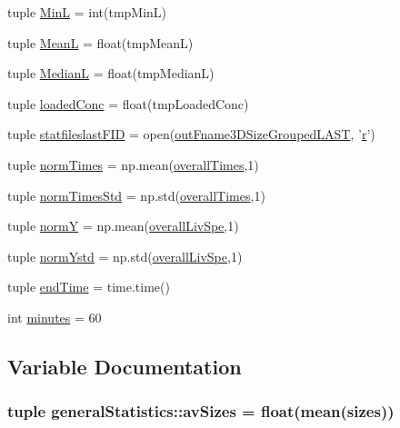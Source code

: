 \begin{DoxyCompactItemize}
tuple \hyperlink{namespacegeneral_statistics_a9d940b683251a6dc9ff0313a5f931da1}{\-Min\-L} = int(tmp\-Min\-L)
\item 
tuple \hyperlink{namespacegeneral_statistics_ab88669192815a1e37e03baefc3417e75}{\-Mean\-L} = float(tmp\-Mean\-L)
\item 
tuple \hyperlink{namespacegeneral_statistics_a3c165f47efb809460b0169ceb049ed52}{\-Median\-L} = float(tmp\-Median\-L)
\item 
tuple \hyperlink{namespacegeneral_statistics_a6b5cf2698396af31b36f7dbd4743164a}{loaded\-Conc} = float(tmp\-Loaded\-Conc)
\item 
tuple \hyperlink{namespacegeneral_statistics_a3ce9d5db09e5f3011e0b7b2375b4e702}{statfileslast\-F\-I\-D} = open(\hyperlink{namespacegeneral_statistics_a41b8a01562c7b02335cd9693c3e23742}{out\-Fname3\-D\-Size\-Grouped\-L\-A\-S\-T}, '\hyperlink{_k_s_search_launcher_8m_ac862e7284527eb913b1351c8bfb8e079}{r}')
\item 
tuple \hyperlink{namespacegeneral_statistics_aa828d0bb88c0d1db3d8477b2452d8e25}{norm\-Times} = np.\-mean(\hyperlink{namespacegeneral_statistics_a7a09c1a430c7f4d0a7a65e70d54651a0}{overall\-Times},1)
\item 
tuple \hyperlink{namespacegeneral_statistics_aed3e07509d7b31285bf3975023e243e1}{norm\-Times\-Std} = np.\-std(\hyperlink{namespacegeneral_statistics_a7a09c1a430c7f4d0a7a65e70d54651a0}{overall\-Times},1)
\item 
tuple \hyperlink{namespacegeneral_statistics_a9693505ac595a3847a5d258750c5b115}{norm\-Y} = np.\-mean(\hyperlink{namespacegeneral_statistics_a4df112574861c37c17c7a7c842bdd4e0}{overall\-Liv\-Spe},1)
\item 
tuple \hyperlink{namespacegeneral_statistics_ab775e3e84f49c48bb285c0713d55a6cd}{norm\-Ystd} = np.\-std(\hyperlink{namespacegeneral_statistics_a4df112574861c37c17c7a7c842bdd4e0}{overall\-Liv\-Spe},1)
\item 
tuple \hyperlink{namespacegeneral_statistics_aeb767013d3dae060634c685e388ffd5c}{end\-Time} = time.\-time()
\item 
int \hyperlink{namespacegeneral_statistics_ac4f1304faada68628850abb2e6101b10}{minutes} = 60
\end{DoxyCompactItemize}


\subsection{\-Variable \-Documentation}
\hypertarget{namespacegeneral_statistics_ad7622b488c1a4fa5f072b59f0bdd0f51}{
\subsubsection[{av\-Sizes}]{\setlength{\rightskip}{0pt plus 5cm}tuple {\bf general\-Statistics\-::av\-Sizes} = float(mean({\bf sizes}))}}\label{namespacegeneral_statistics_ad7622b488c1a4fa5f072b59f0bdd0f51}


